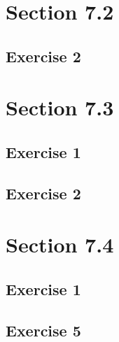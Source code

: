 \documentclass[12pt]{article}%
\begin{document}
\section*{Section 7.2}
\subsection*{Exercise 2}
\section*{Section 7.3}
\subsection*{Exercise 1}
\subsection*{Exercise 2}
\section*{Section 7.4}
\subsection*{Exercise 1}
\subsection*{Exercise 5}
\end{document}
